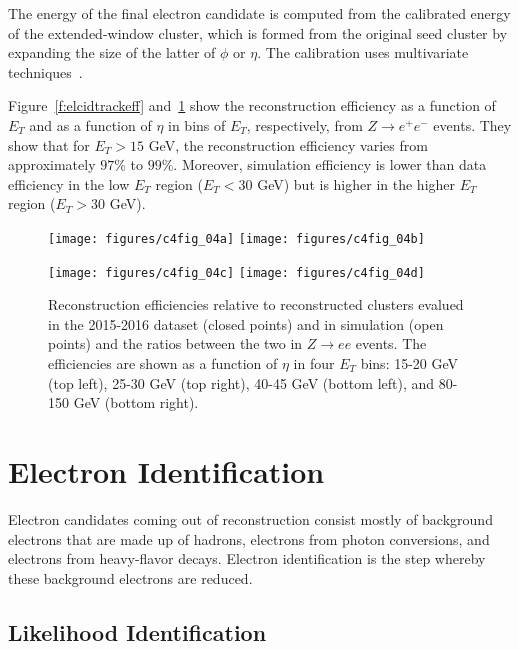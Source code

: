 The energy of the final electron candidate is computed from the calibrated
energy of the extended-window cluster, which is formed from the original seed
cluster by expanding the size of the latter of $\phi$ or $\eta$. The
calibration uses multivariate techniques~\cite{elclusecal1, elclusecal2}.

Figure~\ref{f:elcidtrackeff} and~\ref{f:elcidreceff} show the reconstruction
efficiency as a function of $E_T$ and as a function of $\eta$ in bins of $E_T$,
respectively, from $Z\to e^+e^-$ events. They show that for $E_T > 15$ GeV, the
reconstruction efficiency varies from approximately $97\%$ to $99\%$. Moreover,
simulation efficiency is lower than data efficiency in the low $E_T$ region
($E_T < 30$ GeV) but is higher in the higher $E_T$ region ($E_T > 30$ GeV).

\begin{figure}[H]
	\texttt{[image: figures/c4fig\_04a]}
	\texttt{[image: figures/c4fig\_04b]}


	\texttt{[image: figures/c4fig\_04c]}
	\texttt{[image: figures/c4fig\_04d]}

	\centering

	\caption{Reconstruction efficiencies relative to reconstructed clusters
		evalued in the 2015-2016 dataset (closed points) and in simulation (open
		points) and the ratios between the two in $Z\to ee$ events. The efficiencies
		are shown as a function of $\eta$ in four $E_T$ bins: 15-20 GeV (top left),
		25-30 GeV (top right), 40-45 GeV (bottom left), and 80-150 GeV (bottom
		right).}

	\label{f:elcidreceff}

\end{figure}


\section{Electron Identification}\label{s:eid}

Electron candidates coming out of reconstruction consist mostly of background
electrons that are made up of hadrons, electrons from photon conversions, and
electrons from heavy-flavor decays. Electron identification is the step whereby
these background electrons are reduced.


\subsection{Likelihood Identification}

